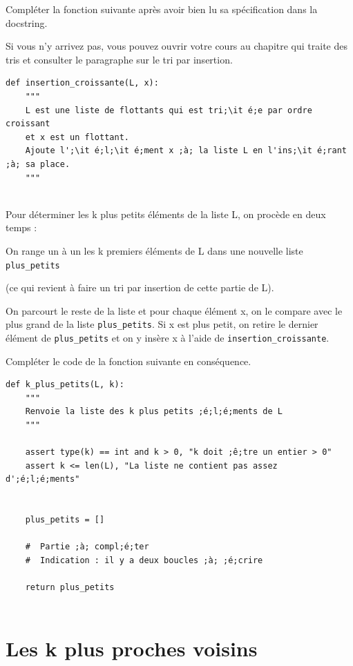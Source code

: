 \medskip

Compléter la fonction suivante après avoir bien lu sa spécification dans la docstring.

Si vous n'y arrivez pas, vous pouvez ouvrir votre cours au chapitre qui traite des tris et consulter le paragraphe sur le tri par insertion.
\begin{lstlisting}[escapeinside =;;]
def insertion_croissante(L, x):
    """
    L est une liste de flottants qui est tri;\it é;e par ordre croissant 
    et x est un flottant.
    Ajoute l';\it é;l;\it é;ment x ;à; la liste L en l'ins;\it é;rant ;à; sa place.
    """
    

\end{lstlisting}


\medskip

Pour déterminer les k plus petits éléments de la liste L, on procède en deux temps :

    On range un à un les k premiers éléments de L dans une nouvelle liste \verb+plus_petits+

(ce qui revient à faire un tri par insertion de cette partie de L).

On parcourt le reste de la liste et pour chaque élément x, on le compare avec le plus grand de la liste \verb+plus_petits+.
Si x est plus petit, on retire le dernier élément de \verb+plus_petits+ et on y insère x à l'aide de \verb+insertion_croissante+.


Compléter le code de la fonction suivante en conséquence.

\begin{lstlisting}[escapeinside =;;]
def k_plus_petits(L, k):
    """
    Renvoie la liste des k plus petits ;é;l;é;ments de L
    """
    
    assert type(k) == int and k > 0, "k doit ;ê;tre un entier > 0"
    assert k <= len(L), "La liste ne contient pas assez d';é;l;é;ments"
    
    
    plus_petits = []
    
    #  Partie ;à; compl;é;ter
    #  Indication : il y a deux boucles ;à; ;é;crire

    return plus_petits
    
\end{lstlisting}



\section{Les k plus proches voisins}


